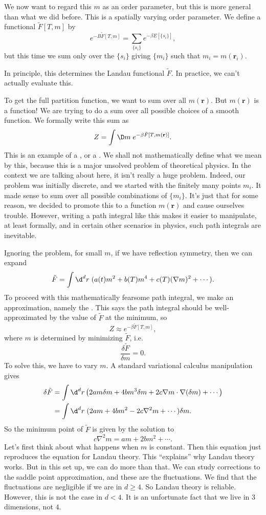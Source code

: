\documentclass[a4paper]{article}
\begin{document}
We now want to regard this $m$ as an order parameter, but this is more general than what we did before. This is a spatially varying order parameter. We define a functional $\tilde{F}[T, m]$ by
\[
  e^{-B \tilde{F}[T, m]} = \sum_{\{s_i\}} e^{-\beta E[\{s_i\}]},
\]
but this time we sum only over the $\{s_i\}$ giving $\{m_i\}$ such that $m_i = m(\mathbf{r}_i)$.

In principle, this determines the Landau functional $\tilde{F}$. In practice, we can't actually evaluate this.

To get the full partition function, we want to sum over all $m(\mathbf{r})$. But $m(\mathbf{r})$ is a function! We are trying to do a sum over all possible choices of a smooth function. We formally write this sum as
\[
  Z = \int \D m\; e^{-\beta \tilde{F}[T, m(\mathbf{r})]}.
\]
This is an example of a , or a . We shall not mathematically define what we mean by this, because this is a major unsolved problem of theoretical physics. In the context we are talking about here, it isn't really a huge problem. Indeed, our problem was initially discrete, and we started with the finitely many points $m_i$. It made sense to sum over all possible combinations of $\{m_i\}$. It's just that for some reason, we decided to promote this to a function $m(\mathbf{r})$ and cause ourselves trouble. However, writing a path integral like this makes it easier to manipulate, at least formally, and in certain other scenarios in physics, such path integrals are inevitable.

Ignoring the problem, for small $m$, if we have reflection symmetry, then we can expand
\[
  \tilde{F} = \int \d^d r\; (a(t) m^2 + b(T) m^4 + c(T) (\nabla m)^2 + \cdots).
\]
To proceed with this mathematically fearsome path integral, we make an approximation, namely the . This says the path integral should be well-approximated by the value of $\tilde{F}$ at the minimum, so
\[
  Z \approx e^{-\beta \tilde{F}[T, m]},
\]
where $m$ is determined by minimizing $\tilde{F}$, i.e.
\[
  \frac{\delta \tilde{F}}{\delta m} = 0.
\]
To solve this, we have to vary $m$. A standard variational calculus manipulation gives
\begin{align*}
  \delta \tilde{F} &= \int \d^d r\left(2a m\delta m + 4b m^3\delta m + 2c \nabla m \cdot \nabla (\delta m) + \cdots\right)\\
  &= \int \d^d r\; (2am + 4b m^2 - 2c \nabla^2 m + \cdots) \delta m.
\end{align*}
So the minimum point of $\tilde{F}$ is given by the solution to
\[
  c \nabla^2 m = am + 2b m^2 + \cdots .\tag{$*$}
\]
Let's first think about what happens when $m$ is constant. Then this equation just reproduces the equation for Landau theory. This ``explains'' why Landau theory works. But in this set up, we can do more than that. We can study corrections to the saddle point approximation, and these are the fluctuations. We find that the fluctuations are negligible if we are in $d \geq 4$. So Landau theory is reliable. However, this is not the case in $d < 4$. It is an unfortunate fact that we live in $3$ dimensions, not $4$.
\end{document}
